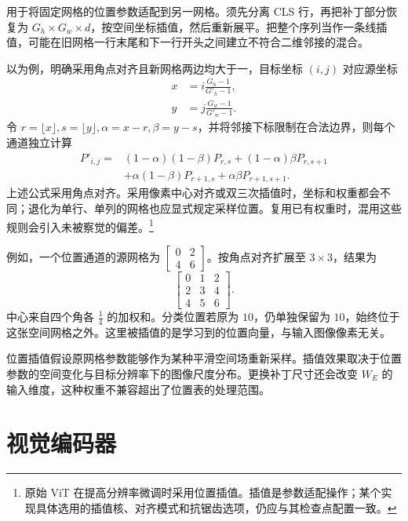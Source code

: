 \documentclass[../textbook.tex]{subfiles}
\begin{document}
用于将固定网格的位置参数适配到另一网格。须先分离 CLS 行，再把补丁部分恢复为 $G_h\times G_w\times d$，按空间坐标插值，然后重新展平。把整个序列当作一条线插值，可能在旧网格一行末尾和下一行开头之间建立不符合二维邻接的混合。

以为例，明确采用角点对齐且新网格两边均大于一，目标坐标 $(i,j)$ 对应源坐标
\begin{equation}
 \begin{aligned}
  x&=i\frac{G_h-1}{G'_h-1},\\
  y&=j\frac{G_w-1}{G'_w-1}.
 \end{aligned}
\end{equation}
令 $r=\lfloor x\rfloor,s=\lfloor y\rfloor,\alpha=x-r,\beta=y-s$，并将邻接下标限制在合法边界，则每个通道独立计算
\begin{align}
 P'_{i,j}={}&(1-\alpha)(1-\beta)P_{r,s}
 +(1-\alpha)\beta P_{r,s+1}\nonumber\\
 &+\alpha(1-\beta)P_{r+1,s}+\alpha\beta P_{r+1,s+1}.
 \label{eq:vit-interpolation}
\end{align}
上述公式采用角点对齐。采用像素中心对齐或双三次插值时，坐标和权重都会不同；退化为单行、单列的网格也应显式规定采样位置。复用已有权重时，混用这些规则会引入未被察觉的偏差。\footnote{原始 ViT 在提高分辨率微调时采用位置插值。插值是参数适配操作；某个实现具体选用的插值核、对齐模式和抗锯齿选项，仍应与其检查点配置一致。}

例如，一个位置通道的源网格为 $\left[\begin{smallmatrix}0&2\\4&6\end{smallmatrix}\right]$。按角点对齐扩展至 $3\times3$，结果为
\begin{equation}
 \begin{bmatrix}0&1&2\\2&3&4\\4&5&6\end{bmatrix}.
\end{equation}
中心来自四个角各 $\frac{1}{4}$ 的加权和。分类位置若原为 $10$，仍单独保留为 $10$，始终位于这张空间网格之外。这里被插值的是学习到的位置向量，与输入图像像素无关。

位置插值假设原网格参数能够作为某种平滑空间场重新采样。插值效果取决于位置参数的空间变化与目标分辨率下的图像尺度分布。更换补丁尺寸还会改变 $W_E$ 的输入维度，这种权重不兼容超出了位置表的处理范围。

\section{视觉编码器}
\end{document}
